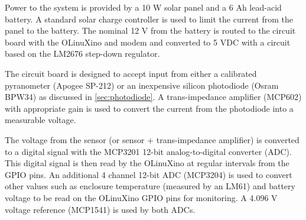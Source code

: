 Power to the system is provided by a 10 W solar panel and a 6 Ah
lead-acid battery.
A standard solar charge controller is used to limit the current from the
panel to the battery.
The nominal 12 V from the battery is routed to the circuit board with
the OLinuXino and modem and converted to 5 VDC with a circuit based on
the LM2676 step-down regulator.

The circuit board is designed to accept input from either a calibrated
pyranometer (Apogee SP-212) or an inexpensive silicon photodiode
(Osram BPW34) as discussed in \cref{sec:photodiode}.
A trans-impedance amplifier (MCP602) with appropriate gain is used to
convert the current from the photodiode into a measurable voltage.

The voltage from the sensor (or sensor + trans-impedance amplifier) is
converted to a digital signal with the MCP3201 12-bit
analog-to-digital converter (ADC).
This digital signal is then read by the OLinuXino at regular intervals
from the GPIO pins.
An additional 4 channel 12-bit ADC (MCP3204) is used to convert other
values such as enclosure temperature (measured by an LM61) and battery
voltage to be read on the OLinuXino GPIO pins for monitoring.
A 4.096 V voltage reference (MCP1541) is used by both ADCs.

